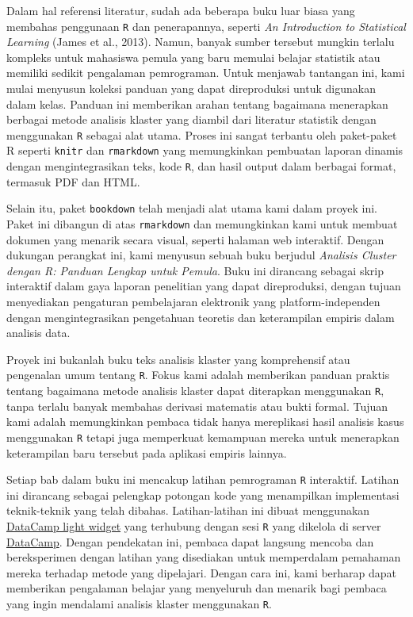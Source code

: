 \documentclass[
  oneside]{book}
\begin{document}
Dalam hal referensi literatur, sudah ada beberapa buku luar biasa yang membahas penggunaan \texttt{R} dan penerapannya, seperti \emph{An Introduction to Statistical Learning} (James et al., 2013). Namun, banyak sumber tersebut mungkin terlalu kompleks untuk mahasiswa pemula yang baru memulai belajar statistik atau memiliki sedikit pengalaman pemrograman. Untuk menjawab tantangan ini, kami mulai menyusun koleksi panduan yang dapat direproduksi untuk digunakan dalam kelas. Panduan ini memberikan arahan tentang bagaimana menerapkan berbagai metode analisis klaster yang diambil dari literatur statistik dengan menggunakan \texttt{R} sebagai alat utama. Proses ini sangat terbantu oleh paket-paket R seperti \texttt{knitr} dan \texttt{rmarkdown} yang memungkinkan pembuatan laporan dinamis dengan mengintegrasikan teks, kode \texttt{R}, dan hasil output dalam berbagai format, termasuk PDF dan HTML.

Selain itu, paket \texttt{bookdown} telah menjadi alat utama kami dalam proyek ini. Paket ini dibangun di atas \texttt{rmarkdown} dan memungkinkan kami untuk membuat dokumen yang menarik secara visual, seperti halaman web interaktif. Dengan dukungan perangkat ini, kami menyusun sebuah buku berjudul \emph{Analisis Cluster dengan R: Panduan Lengkap untuk Pemula}. Buku ini dirancang sebagai skrip interaktif dalam gaya laporan penelitian yang dapat direproduksi, dengan tujuan menyediakan pengaturan pembelajaran elektronik yang platform-independen dengan mengintegrasikan pengetahuan teoretis dan keterampilan empiris dalam analisis data.

Proyek ini bukanlah buku teks analisis klaster yang komprehensif atau pengenalan umum tentang \texttt{R}. Fokus kami adalah memberikan panduan praktis tentang bagaimana metode analisis klaster dapat diterapkan menggunakan \texttt{R}, tanpa terlalu banyak membahas derivasi matematis atau bukti formal. Tujuan kami adalah memungkinkan pembaca tidak hanya mereplikasi hasil analisis kasus menggunakan \texttt{R} tetapi juga memperkuat kemampuan mereka untuk menerapkan keterampilan baru tersebut pada aplikasi empiris lainnya.

Setiap bab dalam buku ini mencakup latihan pemrograman \texttt{R} interaktif. Latihan ini dirancang sebagai pelengkap potongan kode yang menampilkan implementasi teknik-teknik yang telah dibahas. Latihan-latihan ini dibuat menggunakan \href{https://github.com/datacamp/datacamp-light}{DataCamp light widget} yang terhubung dengan sesi \texttt{R} yang dikelola di server \href{https://www.datacamp.com/home}{DataCamp}. Dengan pendekatan ini, pembaca dapat langsung mencoba dan bereksperimen dengan latihan yang disediakan untuk memperdalam pemahaman mereka terhadap metode yang dipelajari. Dengan cara ini, kami berharap dapat memberikan pengalaman belajar yang menyeluruh dan menarik bagi pembaca yang ingin mendalami analisis klaster menggunakan \texttt{R}.
\end{document}
